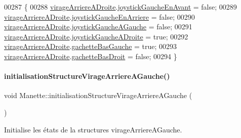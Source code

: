 \begin{DoxyCode}
00287 \{
00288     \hyperlink{class_manette_a6df334aec9f621e7394e9f398221fe9e}{virageArriereADroite}.\hyperlink{struct_etat_manette_deplacement_a8c8e3ca694408bc6a6ced4e20b9da0be}{joystickGaucheEnAvant} = \textcolor{keyword}{false};
00289     \hyperlink{class_manette_a6df334aec9f621e7394e9f398221fe9e}{virageArriereADroite}.\hyperlink{struct_etat_manette_deplacement_a584cf1538425c87588c5b96b79c8d482}{joystickGaucheEnArriere} = \textcolor{keyword}{false};
00290     \hyperlink{class_manette_a6df334aec9f621e7394e9f398221fe9e}{virageArriereADroite}.\hyperlink{struct_etat_manette_deplacement_af7e92a8d8f116e2bc4a5a95386f604e7}{joystickGaucheAGauche} = \textcolor{keyword}{false};
00291     \hyperlink{class_manette_a6df334aec9f621e7394e9f398221fe9e}{virageArriereADroite}.\hyperlink{struct_etat_manette_deplacement_a8fa93da5af430ac00ffd4ee8b76987a2}{joystickGaucheADroite} = \textcolor{keyword}{true};
00292     \hyperlink{class_manette_a6df334aec9f621e7394e9f398221fe9e}{virageArriereADroite}.\hyperlink{struct_etat_manette_deplacement_a0d197e25bc2e0402a068a8d012c25472}{gachetteBasGauche} = \textcolor{keyword}{true};
00293     \hyperlink{class_manette_a6df334aec9f621e7394e9f398221fe9e}{virageArriereADroite}.\hyperlink{struct_etat_manette_deplacement_a4588620c1e2a3543ce67c9a791aac106}{gachetteBasDroit} = \textcolor{keyword}{false};
00294 \}
\end{DoxyCode}
\mbox{\label{class_manette_ad1d146fe52ff367fd2a7fe3c94c165e4}} 
\paragraph{\texorpdfstring{initialisation\+Structure\+Virage\+Arriere\+A\+Gauche()}{initialisationStructureVirageArriereAGauche()}}
{\footnotesize\ttfamily void Manette\+::initialisation\+Structure\+Virage\+Arriere\+A\+Gauche (\begin{DoxyParamCaption}{ }\end{DoxyParamCaption})\hspace{0.3cm}{\ttfamily [private]}}



Initialise les états de la structures virage\+Arriere\+A\+Gauche. 



